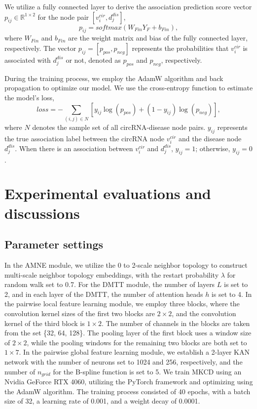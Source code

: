 \documentclass[journal,twoside,web]{ieeecolor}
\begin{document}
We utilize a fully connected layer to derive the association prediction score vector $p_{ij} \in \mathbb{R}^{1\times 2}$ for the node pair $[v_i^{cir}, d_j^{dis}]$,
\begin{equation}
    p_{ij} = softmax(W_{Fin}Y_{F} + b_{Fin}),
\end{equation}
where $W_{Fin}$ and $b_{Fin}$ are the weight matrix and bias of the fully connected layer, respectively. The vector $p_{ij} = [p_{pos}, p_{neg}]$ represents the probabilities that $v_i^{cir}$ is associated with $d_j^{dis}$ or not, denoted as $p_{pos}$ and $p_{neg}$, respectively.

During the training process, we employ the AdamW algorithm and back propagation to optimize our model. We use the cross-entropy function to estimate the model's loss,
\begin{equation}
    loss = - \sum\limits_{(i,j) \in N} \left[ y_{ij} \log (p_{pos}) + (1 - y_{ij}) \log (p_{neg}) \right],
\end{equation}
where $N$ denotes the sample set of all circRNA-disease node pairs. $y_{ij}$ represents the true association label between the circRNA node $v_i^{cir}$ and the disease node $d_j^{dis}$. When there is an association between $v_i^{cir}$ and $d_j^{dis}$, $y_{ij} = 1$; otherwise, $y_{ij} = 0$.

\section{Experimental evaluations and discussions}

\subsection{Parameter settings}

In the AMNE module, we utilize the 0 to 2-scale neighbor topology to construct multi-scale neighbor topology embeddings, with the restart probability $\lambda$ for random walk set to 0.7. For the DMTT module, the number of layers $L$ is set to 2, and in each layer of the DMTT, the number of attention heads $h$ is set to 4. In the pairwise local feature learning module, we employ three blocks, where the convolution kernel sizes of the first two blocks are $2\times 2$, and the convolution kernel of the third block is $1\times 2$. 
The number of channels in the blocks are taken from the set \{32, 64, 128\}. %
The pooling layer of the first block uses a window size of $2\times 2$, while the pooling windows for the remaining two blocks are both set to $1\times 7$. In the pairwise global feature learning module, we establish a 2-layer KAN network with the number of neurons set to 1024 and 256, respectively, and the number of $n_{grid}$ for the B-spline function is set to 5. We train MKCD using an Nvidia GeForce RTX 4060, utilizing the PyTorch framework and optimizing using the AdamW algorithm. The training process consisted of 40 epochs, with a batch size of 32, a learning rate of 0.001, and a weight decay of 0.0001.
\end{document}
